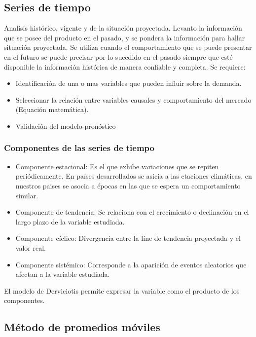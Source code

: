 \documentclass[a4paper, 11pt, oneside]{article}
\begin{document}
\subsection{Series de tiempo}

Analisis histórico, vigente y de la situación proyectada. Levanto la información que se posee del producto en el
pasado, y se pondera la información para hallar situación proyectada. Se utiliza cuando el comportamiento que se puede
presentar en el futuro se puede precisar por lo sucedido en el pasado siempre que esté disponible la información histórica
de manera confiable y completa. Se requiere:

\begin{itemize}
	\item Identificación de una o mas variables que pueden influir sobre la demanda.
	\item Seleccionar la relación entre variables causales y comportamiento del mercado (Equación matemática).
	\item Validación del modelo-pronóstico
\end{itemize}

\subsubsection{Componentes de las series de tiempo}

\begin{itemize}
	\item Componente estacional:
	Es el que exhibe variaciones que se repiten periódicamente. En países desarrollados se asicia a las etaciones
	climáticas, en nuestros paises se asocia a épocas en las que se espera un comportamiento similar.
	\item Componente de tendencia:
	Se relaciona con el crecimiento o declinación en el largo plazo de la variable estudiada.
	\item Componente cíclico:
	Divergencia entre la líne de tendencia proyectada y el valor real.
	\item Componente sistémico:
	Corresponde a la aparición de eventos aleatorios que afectan a la variable estudiada.
\end{itemize}

El modelo de Derviciotis permite expresar la variable como el producto de los componentes.

\subsection {Método de promedios móviles}
\end{document}
